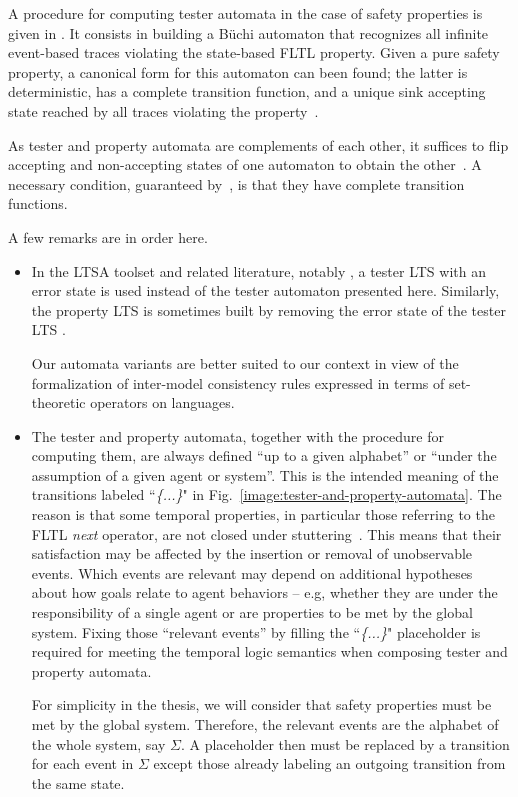 A procedure for computing tester automata in the case of safety properties is given in \cite{Giannakopoulou:2003}. It consists in building a B\"uchi automaton that recognizes all infinite event-based traces violating the state-based FLTL property. Given a pure safety property, a canonical form for this automaton can been found; the latter is deterministic, has a complete transition function, and a unique sink accepting state reached by all traces violating the property~\cite{Giannakopoulou:2003}.

As tester and property automata are complements of each other, it suffices to flip accepting and non-accepting states of one automaton to obtain the other~\cite{Hopcroft:1979}. A necessary condition, guaranteed by~\cite{Giannakopoulou:2003}, is that they have complete transition functions.

A few remarks are in order here.
\begin{itemize}
\item In the LTSA toolset \cite{Magee:1999} and related literature, notably \cite{Giannakopoulou:2003}, a tester LTS with an error state is used instead of the tester automaton presented here. Similarly, the property LTS is sometimes built by removing the error state of the tester LTS \cite{Letier:2008}. 

Our automata variants are better suited to our context in view of the formalization of inter-model consistency rules expressed in terms of set-theoretic operators on languages.

\item The tester and property automata, together with the procedure for computing them, are always defined ``up to a given alphabet'' or ``under the assumption of a given agent or system''. This is the intended meaning of the transitions labeled ``\emph{\{...\}}" in Fig.~\ref{image:tester-and-property-automata}. The reason is that some temporal properties, in particular those referring to the FLTL \emph{next} operator, are not closed under stuttering~\cite{Lamport:1994}. This means that their satisfaction may be affected by the insertion or removal of unobservable events. Which events are relevant may depend on additional hypotheses about how goals relate to agent behaviors -- e.g, whether they are under the responsibility of a single agent or are properties to be met by the global system. Fixing those ``relevant events'' by filling the ``\emph{\{...\}}" placeholder is required for meeting the temporal logic semantics when composing tester and property automata. 

For simplicity in the thesis, we will consider that safety properties must be met by the global system. Therefore, the relevant events are the alphabet of the whole system, say $\Sigma$. A placeholder then must be replaced by a transition for each event in $\Sigma$ except those already labeling an outgoing transition from the same state.
\end{itemize}

